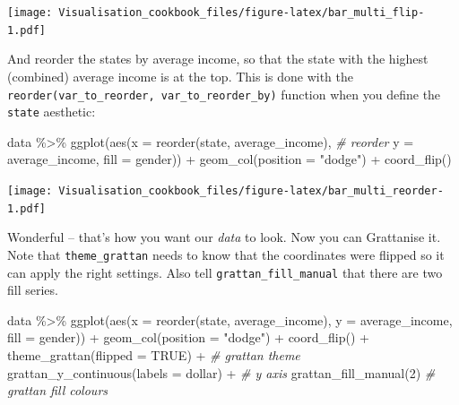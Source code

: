 \documentclass[
]{book}
\newenvironment{Shaded}{\begin{snugshade}}{\end{snugshade}}
\newcommand{\AttributeTok}[1]{\textcolor[rgb]{0.77,0.63,0.00}{#1}}
\newcommand{\CommentTok}[1]{\textcolor[rgb]{0.56,0.35,0.01}{\textit{#1}}}
\newcommand{\ConstantTok}[1]{\textcolor[rgb]{0.00,0.00,0.00}{#1}}
\newcommand{\DecValTok}[1]{\textcolor[rgb]{0.00,0.00,0.81}{#1}}
\newcommand{\FunctionTok}[1]{\textcolor[rgb]{0.00,0.00,0.00}{#1}}
\newcommand{\NormalTok}[1]{#1}
\newcommand{\SpecialCharTok}[1]{\textcolor[rgb]{0.00,0.00,0.00}{#1}}
\newcommand{\StringTok}[1]{\textcolor[rgb]{0.31,0.60,0.02}{#1}}
\begin{document}
\texttt{[image: Visualisation\_cookbook\_files/figure-latex/bar\_multi\_flip-1.pdf]}

And reorder the states by average income, so that the state with the highest (combined) average income is at the top. This is done with the \texttt{reorder(var\_to\_reorder,\ var\_to\_reorder\_by)} function when you define the \texttt{state} aesthetic:

\begin{Shaded}
\begin{Highlighting}[]
\NormalTok{data }\SpecialCharTok{\%\textgreater{}\%} 
  \FunctionTok{ggplot}\NormalTok{(}\FunctionTok{aes}\NormalTok{(}\AttributeTok{x =} \FunctionTok{reorder}\NormalTok{(state, average\_income), }\CommentTok{\# reorder}
             \AttributeTok{y =}\NormalTok{ average\_income,}
             \AttributeTok{fill =}\NormalTok{ gender)) }\SpecialCharTok{+} 
  \FunctionTok{geom\_col}\NormalTok{(}\AttributeTok{position =} \StringTok{"dodge"}\NormalTok{) }\SpecialCharTok{+} 
  \FunctionTok{coord\_flip}\NormalTok{()}
\end{Highlighting}
\end{Shaded}

\texttt{[image: Visualisation\_cookbook\_files/figure-latex/bar\_multi\_reorder-1.pdf]}

Wonderful -- that's how you want our \emph{data} to look. Now you can Grattanise it. Note that \texttt{theme\_grattan} needs to know that the coordinates were flipped so it can apply the right settings. Also tell \texttt{grattan\_fill\_manual} that there are two fill series.

\begin{Shaded}
\begin{Highlighting}[]
\NormalTok{data }\SpecialCharTok{\%\textgreater{}\%} 
  \FunctionTok{ggplot}\NormalTok{(}\FunctionTok{aes}\NormalTok{(}\AttributeTok{x =} \FunctionTok{reorder}\NormalTok{(state, average\_income), }
             \AttributeTok{y =}\NormalTok{ average\_income,}
             \AttributeTok{fill =}\NormalTok{ gender)) }\SpecialCharTok{+} 
  \FunctionTok{geom\_col}\NormalTok{(}\AttributeTok{position =} \StringTok{"dodge"}\NormalTok{) }\SpecialCharTok{+} 
  \FunctionTok{coord\_flip}\NormalTok{() }\SpecialCharTok{+} 
  \FunctionTok{theme\_grattan}\NormalTok{(}\AttributeTok{flipped =} \ConstantTok{TRUE}\NormalTok{) }\SpecialCharTok{+} \CommentTok{\# grattan theme}
  \FunctionTok{grattan\_y\_continuous}\NormalTok{(}\AttributeTok{labels =}\NormalTok{ dollar) }\SpecialCharTok{+} \CommentTok{\# y axis}
  \FunctionTok{grattan\_fill\_manual}\NormalTok{(}\DecValTok{2}\NormalTok{) }\CommentTok{\# grattan fill colours}
\end{Highlighting}
\end{Shaded}
\end{document}
